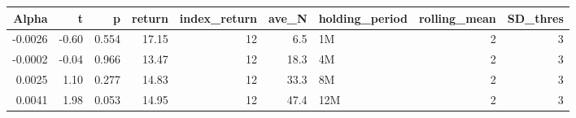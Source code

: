 \begin{table}[ht]
\centering
\begin{tabular}{rrrrrrlrr}
  \hline
Alpha & t & p & return & index\_return & ave\_N & holding\_period & rolling\_mean & SD\_thres \\ 
  \hline
-0.0026 & -0.60 & 0.554 & 17.15 & 12 & 6.5 & 1M &  2 &  3 \\ 
  -0.0002 & -0.04 & 0.966 & 13.47 & 12 & 18.3 & 4M &  2 &  3 \\ 
  0.0025 & 1.10 & 0.277 & 14.83 & 12 & 33.3 & 8M &  2 &  3 \\ 
  0.0041 & 1.98 & 0.053 & 14.95 & 12 & 47.4 & 12M &  2 &  3 \\ 
   \hline
\end{tabular}
\end{table}

